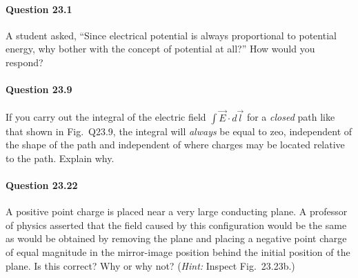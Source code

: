 \documentclass[11pt]{article}
\newenvironment{problem}
{
    \color{darkgray}
    \ignorespaces
}
\renewcommand{\vec}[1]{\mathbf{#1}}
\begin{document}
	

\newcommand{\vE}{\vec{E}}

\paragraph{Question 23.1}
\begin{problem}
	A student asked, ``Since electrical potential is always proportional to potential energy, why bother with the concept of potential at all?''  How would you respond?
\end{problem}

\vfill


\paragraph{Question 23.9}
\begin{problem}
	If you carry out the integral of the electric field $\int \vE \cdot d\vec{l}$ for a \emph{closed} path like that shown in Fig.~Q23.9, the integral will \emph{always} be equal to zeo, independent of the shape of the path and independent of where charges may be located relative to the path.  Explain why.
\end{problem}

\vfill


\paragraph{Question 23.22}
\begin{problem}
	A positive point charge is placed near a very large conducting plane.  A professor of physics asserted that the field caused by this configuration would be the same as would be obtained by removing the plane and placing a negative point charge of equal magnitude in the mirror-image position behind the initial position of the plane.  Is this correct?  Why or why not?  (\emph{Hint:} Inspect Fig.~23.23b.)
\end{problem}

\vfill

\clearpage
\end{document}
